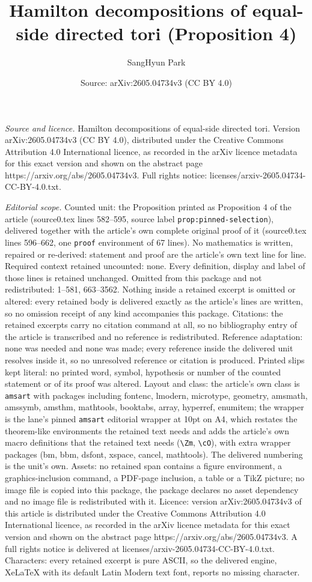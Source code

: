 \documentclass[10pt,a4paper]{amsart}
\title[Hamilton decompositions of equal-side directed tori]{Hamilton decompositions of equal-side directed tori (Proposition 4)}
\author{SangHyun Park}
\date{Source: arXiv:2605.04734v3 (CC BY 4.0)}
\begin{document}
\maketitle

\noindent\emph{Source and licence.} Hamilton decompositions of equal-side directed tori. Version arXiv:2605.04734v3 (CC BY 4.0), distributed under the Creative Commons Attribution 4.0 International licence, as recorded in the arXiv licence metadata for this exact version and shown on the abstract page https://arxiv.org/abs/2605.04734v3. Full rights notice: licenses/arxiv-2605.04734-CC-BY-4.0.txt.\par\smallskip

\noindent\textit{Editorial scope.} Counted unit: the Proposition printed as Proposition 4 of the article (source0.tex lines 582--595, source label \texttt{prop:pinned-selection}), delivered together with the article's own complete original proof of it (source0.tex lines 596--662, one \texttt{proof} environment of 67 lines). No mathematics is written, repaired or re-derived: statement and proof are the article's own text line for line. Required context retained uncounted: none. Every definition, display and label of those lines is retained unchanged. Omitted from this package and not redistributed: 1--581, 663--3562. Nothing inside a retained excerpt is omitted or altered: every retained body is delivered exactly as the article's lines are written, so no omission receipt of any kind accompanies this package. Citations: the retained excerpts carry no citation command at all, so no bibliography entry of the article is transcribed and no reference is redistributed. Reference adaptation: none was needed and none was made; every reference inside the delivered unit resolves inside it, so no unresolved reference or citation is produced. Printed slips kept literal: no printed word, symbol, hypothesis or number of the counted statement or of its proof was altered. Layout and class: the article's own class is \texttt{amsart} with packages including fontenc, lmodern, microtype, geometry, amsmath, amssymb, amsthm, mathtools, booktabs, array, hyperref, enumitem; the wrapper is the lane's pinned \texttt{amsart} editorial wrapper at 10pt on A4, which restates the theorem-like environments the retained text needs and adds the article's own macro definitions that the retained text needs (\texttt{\textbackslash Zm}, \texttt{\textbackslash cO}), with extra wrapper packages (bm, bbm, dsfont, xspace, cancel, mathtools). The delivered numbering is the unit's own. Assets: no retained span contains a figure environment, a graphics-inclusion command, a PDF-page inclusion, a table or a TikZ picture; no image file is copied into this package, the package declares no asset dependency and no image file is redistributed with it. Licence: version arXiv:2605.04734v3 of this article is distributed under the Creative Commons Attribution 4.0 International licence, as recorded in the arXiv licence metadata for this exact version and shown on the abstract page https://arxiv.org/abs/2605.04734v3. A full rights notice is delivered at licenses/arxiv-2605.04734-CC-BY-4.0.txt. Characters: every retained excerpt is pure ASCII, so the delivered engine, XeLaTeX with its default Latin Modern text font, reports no missing character.
\end{document}
